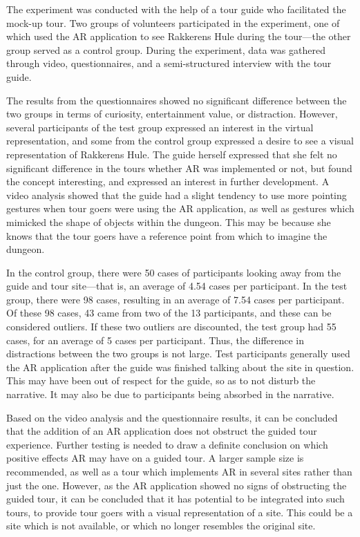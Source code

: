 The experiment was conducted with the help of a tour guide who facilitated the mock-up tour. Two groups of volunteers participated in the experiment, one of which used the AR application to see Rakkerens Hule during the tour---the other group served as a control group. During the experiment, data was gathered through video, questionnaires, and a semi-structured interview with the tour guide.

The results from the questionnaires showed no significant difference between the two groups in terms of curiosity, entertainment value, or distraction. However, several participants of the test group expressed an interest in the virtual representation, and some from the control group expressed a desire to see a visual representation of Rakkerens Hule. The guide herself expressed that she felt no significant difference in the tours whether AR was implemented or not, but found the concept interesting, and expressed an interest in further development. A video analysis showed that the guide had a slight tendency to use more pointing gestures when tour goers were using the AR application, as well as gestures which mimicked the shape of objects within the dungeon. This may be because she knows that the tour goers have a reference point from which to imagine the dungeon.

In the control group, there were 50 cases of participants looking away from the guide and tour site---that is, an average of 4.54 cases per participant. In the test group, there were 98 cases, resulting in an average of 7.54 cases per participant. Of these 98 cases, 43 came from two of the 13 participants, and these can be considered outliers. If these two outliers are discounted, the test group had 55 cases, for an average of 5 cases per participant. Thus, the difference in distractions between the two groups is not large. Test participants generally used the AR application after the guide was finished talking about the site in question. This may have been out of respect for the guide, so as to not disturb the narrative. It may also be due to participants being absorbed in the narrative. 

Based on the video analysis and the questionnaire results, it can be concluded that the addition of an AR application does not obstruct the guided tour experience. Further testing is needed to draw a definite conclusion on which positive effects AR may have on a guided tour. A larger sample size is recommended, as well as a tour which implements AR in several sites rather than just the one. However, as the AR application showed no signs of obstructing the guided tour, it can be concluded that it has potential to be integrated into such tours, to provide tour goers with a visual representation of a site. This could be a site which is not available, or which no longer resembles the original site.